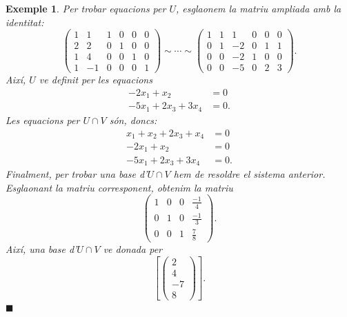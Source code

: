 \documentclass[
  11pt,
]{book}
\numberwithin{dummy}{section}
\theoremstyle{maincolornumbox}
\theoremstyle{blacknumex}
\newtheorem{exampleT}{Exemple}[chapter]
\theoremstyle{blacknumbox}
\theoremstyle{maincolornum}
\newenvironment{example}{\begin{exampleT}}{\hfill{\tiny\ensuremath{\blacksquare}}\end{exampleT}}
\newlength\esp
\begin{document}
\begin{example}
Per trobar equacions per \(U\), esglaonem la matriu ampliada amb la
identitat: \[\left(
    \begin{array}{rr|rrrr}
1 & 1 & 1&0&0&0\\
2&2&0&1&0&0\\
1&4&0&0&1&0\\
1&-1&0&0&0&1
    \end{array}
    \right)\sim\cdots\sim    \left(
    \begin{array}{rr|rrrr}
1&1&1&0&0&0\\
0&1&-2&0&1&1\\\hline
0&0&-2&1&0&0\\
0&0&-5&0&2&3
    \end{array}
    \right).\] Així, \(U\) ve definit per les equacions \begin{align*}
    -2x_1+x_2 &= 0\\
    -5x_1 +2x_3+3x_4&=0.
\end{align*} Les equacions per \(U\cap V\) són, doncs:
\begin{align*}
    x_1+x_2+2x_3+x_4&=0\\
    -2x_1+x_2 &= 0\\
    -5x_1 +2x_3+3x_4&=0.
\end{align*} Finalment, per trobar una base d'\(U\cap V\) hem de
resoldre el sistema anterior. Esglaonant la matriu corresponent, obtenim
la matriu \[\left(\begin{array}{rrrr}
        1&0&0&\frac{-1}{4}\\
        0&1&0&\frac{-1}{3}\\
        0&0&1&\frac{7}{8}
        \end{array}\right).\] Així, una base d'\(U\cap V\) ve donada per
\[\left[\begin{pmatrix}2\\4\\-7\\8\end{pmatrix}\right].\]
\end{example}
\end{document}
